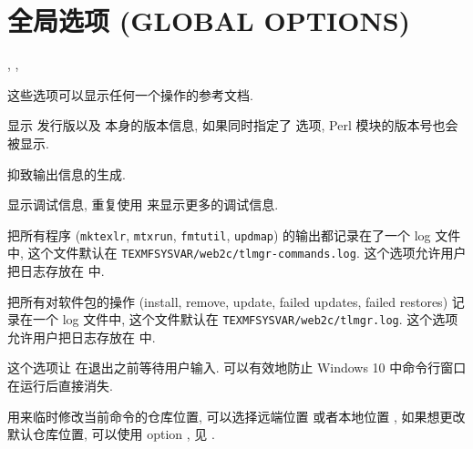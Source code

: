 \section[全局选项]{全局选项 (GLOBAL OPTIONS)}
\begin{description}
    \item {}, , \par
    这些选项可以显示任何一个操作的参考文档. 
    \item {}\par
    显示 \tl 发行版以及 \tlmgr 本身的版本信息, 如果同时指定了  选项, \tl{} Perl 模块的版本号也会被显示. 
    \item {}\par
    抑致输出信息的生成. 
    \item {}\par
    显示调试信息, 重复使用  来显示更多的调试信息. 
    \item {} \par
    \tlmgr 把所有程序 (\texttt{mktexlr}, \texttt{mtxrun}, \texttt{fmtutil}, \texttt{updmap}) 的输出都记录在了一个 log 文件中, 这个文件默认在 \texttt{TEXMFSYSVAR/web2c/tlmgr-commands.log}. 这个选项允许用户把日志存放在  中. 
    \item {} \par
    \tlmgr 把所有对软件包的操作 (\ac{install}, \ac{remove}, \ac{update}, failed updates, failed restores) 记录在一个 log 文件中, 这个文件默认在 \texttt{TEXMFSYSVAR/web2c/tlmgr.log}. 这个选项允许用户把日志存放在  中. 
    \item {}\par
    这个选项让 \tlmgr 在退出之前等待用户输入. 可以有效地防止 Windows 10 中命令行窗口在运行后直接消失. 
    \item {} \par
    用来临时修改当前命令的仓库位置, 可以选择远端位置  或者本地位置 , 如果想更改默认仓库位置, 可以使用 \tlmgr{} \ac{option} , 见 . 
\end{description}